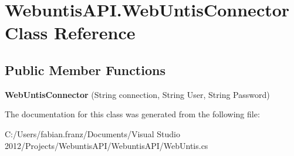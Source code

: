 \hypertarget{class_webuntis_a_p_i_1_1_web_untis_connector}{\section{Webuntis\-A\-P\-I.\-Web\-Untis\-Connector Class Reference}
\label{class_webuntis_a_p_i_1_1_web_untis_connector}
}
\subsection*{Public Member Functions}
\begin{DoxyCompactItemize}
\item 
\hypertarget{class_webuntis_a_p_i_1_1_web_untis_connector_ab1df017bfe02cdf931eed93bc00c6d8b}{{\bfseries Web\-Untis\-Connector} (String connection, String User, String Password)}\label{class_webuntis_a_p_i_1_1_web_untis_connector_ab1df017bfe02cdf931eed93bc00c6d8b}

\end{DoxyCompactItemize}


The documentation for this class was generated from the following file\-:\begin{DoxyCompactItemize}
\item 
C\-:/\-Users/fabian.\-franz/\-Documents/\-Visual Studio 2012/\-Projects/\-Webuntis\-A\-P\-I/\-Webuntis\-A\-P\-I/Web\-Untis.\-cs\end{DoxyCompactItemize}
